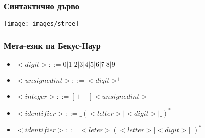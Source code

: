 \documentclass{beamer}
\begin{document}


\begin{frame}[fragile]
\frametitle{Синтактично дърво}

\begin{center}
\vspace*{-40pt}
\texttt{[image: images/stree]}
\end{center}



\end{frame}

\begin{frame}[fragile]
\frametitle{Мета-език на Бекус-Наур}

\begin{itemize}
\item $<digit> ::= 0 | 1 | 2 | 3 | 4 | 5 | 6 | 7 | 8 | 9 $
\item $<unsigned int> ::= <digit>^+$
\item $<integer> ::= [+|-] <unsigned int>$
\item $<identifier> ::= \_ (<letter> | <digit> | \_ )^* $
\item $<identifier> ::= <leter> (<letter> | <digit> | \_ )^* $
\end{itemize}

\end{frame}
\end{document}
